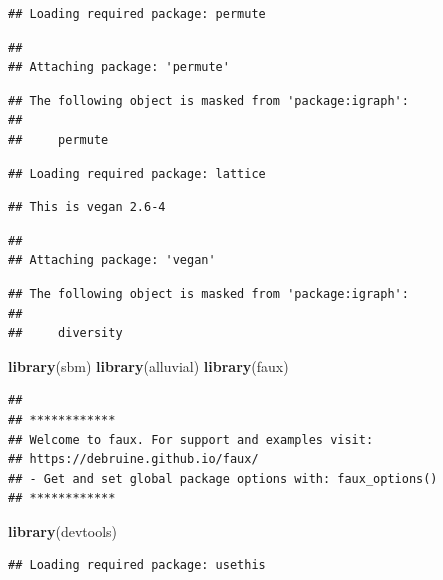 \documentclass[
]{book}
\newenvironment{Shaded}{\begin{snugshade}}{\end{snugshade}}
\newcommand{\FunctionTok}[1]{\textcolor[rgb]{0.13,0.29,0.53}{\textbf{#1}}}
\newcommand{\NormalTok}[1]{#1}
\theoremstyle{definition}
\theoremstyle{definition}
\theoremstyle{definition}
\theoremstyle{definition}
\theoremstyle{remark}
\begin{document}
\begin{verbatim}
## Loading required package: permute
\end{verbatim}

\begin{verbatim}
## 
## Attaching package: 'permute'
\end{verbatim}

\begin{verbatim}
## The following object is masked from 'package:igraph':
## 
##     permute
\end{verbatim}

\begin{verbatim}
## Loading required package: lattice
\end{verbatim}

\begin{verbatim}
## This is vegan 2.6-4
\end{verbatim}

\begin{verbatim}
## 
## Attaching package: 'vegan'
\end{verbatim}

\begin{verbatim}
## The following object is masked from 'package:igraph':
## 
##     diversity
\end{verbatim}

\begin{Shaded}
\begin{Highlighting}[]
\FunctionTok{library}\NormalTok{(sbm)}
\FunctionTok{library}\NormalTok{(alluvial)}
\FunctionTok{library}\NormalTok{(faux)}
\end{Highlighting}
\end{Shaded}

\begin{verbatim}
## 
## ************
## Welcome to faux. For support and examples visit:
## https://debruine.github.io/faux/
## - Get and set global package options with: faux_options()
## ************
\end{verbatim}

\begin{Shaded}
\begin{Highlighting}[]
\FunctionTok{library}\NormalTok{(devtools) }
\end{Highlighting}
\end{Shaded}

\begin{verbatim}
## Loading required package: usethis
\end{verbatim}
\end{document}
